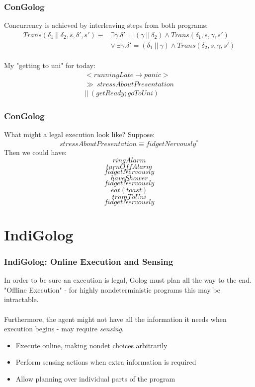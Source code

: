 \documentclass{beamer}
\begin{document}
\begin{frame}
\frametitle{ConGolog}
Concurrency is achieved by interleaving steps from both programs:
\[
\begin{array}{cc}
Trans(\delta_1\ ||\ \delta_2,s,\delta',s') \equiv & \exists \gamma . \delta'=(\gamma\ ||\ \delta_2)\wedge Trans(\delta_1,s,\gamma,s')\\
& \vee\ \exists \gamma . \delta'=(\delta_1\ ||\ \gamma)\wedge Trans(\delta_2,s,\gamma,s')
\end{array}\]
\pause
\ \\
My "getting to uni" for today:
\[
\begin{array}{c}
<runningLate\rightarrow panic>\\
\gg\ stressAboutPresentation\\
||\ (getReady;goToUni)
\end{array}\]

\end{frame}

\begin{frame}
\frametitle{ConGolog}
What might a legal execution look like?  Suppose:\[
stressAboutPresentation \equiv fidgetNervously^*\]
Then we could have:
\[ringAlarm\]
\[turnOffAlarm\]
\[fidgetNervously\]
\[haveShower\]
\[fidgetNervously\]
\[eat(toast)\]
\[tramToUni\]
\[fidgetNervously\]


\end{frame}

\section{IndiGolog}
\begin{frame}
\frametitle{IndiGolog: Online Execution and Sensing}
In order to be sure an execution is legal, Golog must plan all the way
to the end.  "Offline Execution" - for highly nondeterministic programs
this may be intractable.\\
\ \\
Furthermore, the agent might not have all the information it needs when
execution begins - may require \emph{sensing}.

\begin{itemize}
  \pause
  \item Execute online, making nondet choices arbitrarily
  \pause
  \item Perform sensing actions when extra information is required
  \pause
  \item Allow planning over individual parts of the program
\end{itemize}
\end{frame}
\end{document}
